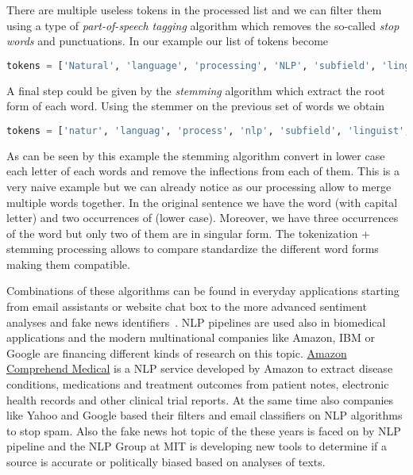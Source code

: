 \documentclass{standalone}
\begin{document}
There are multiple useless tokens in the processed list and we can filter them using a type of \emph{part-of-speech tagging} algorithm which removes the so-called \emph{stop words} and punctuations.
In our example our list of tokens become

\lstset{style=snippet}
\begin{lstlisting}[language=Python, caption=Filtering stop-words and punctuations, label=code:filter]
tokens = ['Natural', 'language', 'processing', 'NLP', 'subfield', 'linguistics', 'computer', 'science', 'information', 'engineering', 'artificial', 'intelligence', 'concerned', 'interactions', 'computers','human', 'natural', 'languages', 'particular', 'program', 'computers', 'process', 'analyze', 'large', 'amounts', 'natural', 'language', 'data']
\end{lstlisting}

A final step could be given by the \emph{stemming} algorithm which extract the root form of each word.
Using the stemmer on the previous set of words we obtain

\lstset{style=snippet}
\begin{lstlisting}[language=Python, caption=Stemming, label=code:stem]
tokens = ['natur', 'languag', 'process', 'nlp', 'subfield', 'linguist', 'comput', 'scienc', 'inform', 'engin', 'artifici', 'intellig', 'concern', 'interact', 'comput', 'human', 'natur', 'languag', 'particular', 'program', 'comput', 'process', 'analyz', 'larg', 'amount', 'natur', 'languag', 'data']
\end{lstlisting}

As can be seen by this example the stemming algorithm convert in lower case each letter of each words and remove the inflections from each of them.
This is a very naive example but we can already notice as our processing allow to merge multiple words together.
In the original sentence we have the word  (with capital letter) and two occurrences of  (lower case).
Moreover, we have three occurrences of the  word but only two of them are in singular form.
The tokenization + stemming processing allows to compare standardize the different word forms making them compatible.

Combinations of these algorithms can be found in everyday applications starting from email assistants or website chat box to the more advanced sentiment analyses and fake news identifiers~\cite{IJST119594, MitaliSentiment2016, sharma2019combating, zhou2018fake}.
NLP pipelines are used also in biomedical applications and the modern multinational companies like Amazon, IBM or Google are financing different kinds of research on this topic.
\href{https://aws.amazon.com/it/comprehend/medical/}{Amazon Comprehend Medical} is a NLP service developed by Amazon to extract disease conditions, medications and treatment outcomes from patient notes, electronic health records and other clinical trial reports.
At the same time also companies like Yahoo and Google based their filters and email classifiers on NLP algorithms to stop spam.
Also the fake news hot topic of the these years is faced on by NLP pipeline and the NLP Group at MIT is developing new tools to determine if a source is accurate or politically biased based on analyses of texts.
\end{document}
